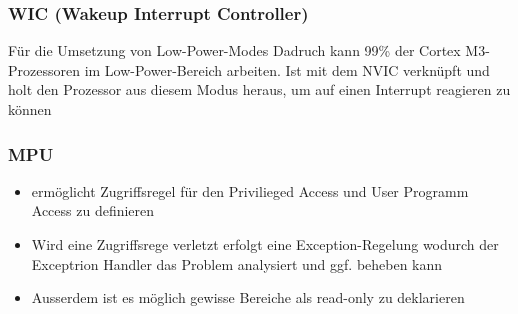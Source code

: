 \begin{multicols}{2}
    \begin{minipage}{\linewidth}
        \subsubsection{WIC (Wakeup Interrupt Controller)}
        Für die Umsetzung von Low-Power-Modes\newline
        Dadruch kann 99\% der Cortex M3-Prozessoren im Low-Power-Bereich arbeiten.
        \newline
        Ist mit dem NVIC verknüpft und holt den Prozessor aus diesem Modus heraus, um auf einen Interrupt reagieren zu können
    \end{minipage}
    
    \begin{minipage}{\linewidth}
        \subsubsection{MPU}
        \begin{itemize}
            \item ermöglicht Zugriffsregel für den Privilieged Access und User Programm Access zu definieren
            \item \rightarrow Wird eine Zugriffsrege verletzt erfolgt eine Exception-Regelung wodurch der Exceptrion Handler das Problem analysiert und ggf. beheben kann
            \item \rightarrow Ausserdem ist es möglich gewisse Bereiche als read-only zu deklarieren
            \end{itemize}
    \end{minipage}
\end{multicols}
\clearpage
